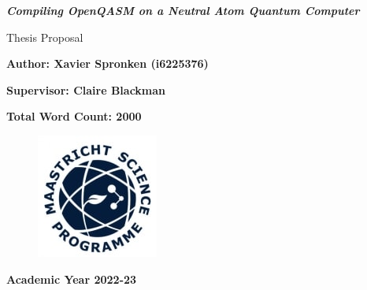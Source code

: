 \documentclass[12pt]{article}
\begin{document}
\begin{titlepage}
    \begin{center}
        \textbf{}
        \vspace{3cm}
        
        \LARGE
        \textbf{\textit{Compiling OpenQASM on a Neutral Atom Quantum Computer}}
        
        \vspace{1cm}
        Thesis Proposal
        
        \vspace{0.7cm}
        \textbf{Author: Xavier Spronken (i6225376)}
        
        \vspace{0.5cm}
        \normalsize
        
        \vspace{1cm}
        \large
        \textbf{Supervisor: Claire Blackman}
        
        \vspace{1cm}
        \textbf{Total Word Count: 2000 \\} 
        \normalsize
        
        \vfill
        
        \begin{figure}[H]
            \centering
            \includegraphics{Images/msp-logo.jpeg}
            \label{fig:msp-logo}
        \end{figure}
        
        \vspace{0.5cm}
        \textbf{Academic Year 2022-23}
        
    \end{center}
\end{titlepage}

\tableofcontents

\newpage








\newpage

 
\end{document}
